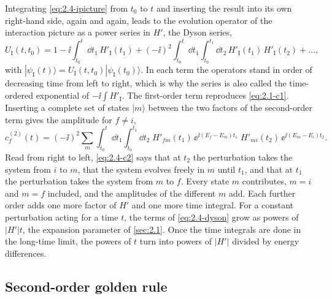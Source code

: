Integrating \cref{eq:2.4-ipicture} from $t_0$ to $t$ and inserting the result into its own right-hand side, again and again, leads to the evolution operator of the interaction picture as a power series in $H'$, the Dyson series,
\begin{equation}
  U_{\mathrm{I}}(t, t_0) = 1 - \ii\int_{t_0}^{t}\dd t_1\,H'_{\mathrm{I}}(t_1) + (-\ii)^2\int_{t_0}^{t}\dd t_1\int_{t_0}^{t_1}\dd t_2\,H'_{\mathrm{I}}(t_1)\,H'_{\mathrm{I}}(t_2) + \dots ,
  \label{eq:2.4-dyson}
\end{equation}
with $|\psi_{\mathrm{I}}(t)\rangle = U_{\mathrm{I}}(t, t_0)|\psi_{\mathrm{I}}(t_0)\rangle$. In each term the operators stand in order of decreasing time from left to right, which is why the series is also called the time-ordered exponential of $-\ii\int H'_{\mathrm{I}}$. The first-order term reproduces \cref{eq:2.1-c1}. Inserting a complete set of states $|m\rangle$ between the two factors of the second-order term gives the amplitude for $f \ne i$,
\begin{equation}
  c^{(2)}_f(t) = (-\ii)^2\sum_m\int_{t_0}^{t}\dd t_1\int_{t_0}^{t_1}\dd t_2\;H'_{fm}(t_1)\,\ee^{\ii(E_f - E_m)t_1}\;H'_{mi}(t_2)\,\ee^{\ii(E_m - E_i)t_2} .
  \label{eq:2.4-c2}
\end{equation}
Read from right to left, \cref{eq:2.4-c2} says that at $t_2$ the perturbation takes the system from $i$ to $m$, that the system evolves freely in $m$ until $t_1$, and that at $t_1$ the perturbation takes the system from $m$ to $f$. Every state $m$ contributes, $m = i$ and $m = f$ included, and the amplitudes of the different $m$ add. Each further order adds one more factor of $H'$ and one more time integral. For a constant perturbation acting for a time $t$, the terms of \cref{eq:2.4-dyson} grow as powers of $|H'|t$, the expansion parameter of \cref{sec:2.1}. Once the time integrals are done in the long-time limit, the powers of $t$ turn into powers of $|H'|$ divided by energy differences.

\subsection{Second-order golden rule}

